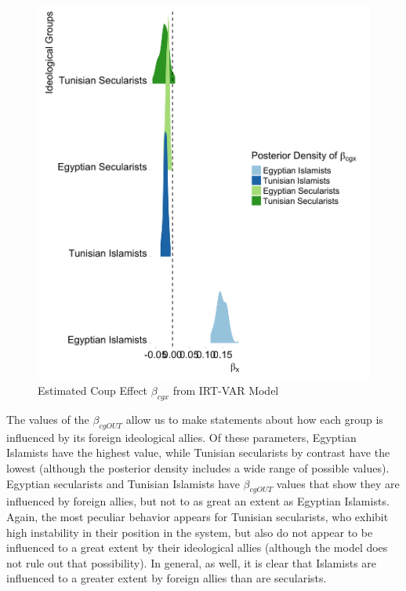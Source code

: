 \documentclass[12pt]{article}
\begin{document}
 \begin{figure}[!h]
	\centering
	\caption{Estimated Coup Effect $\beta_{cgx}$ from IRT-VAR Model}\label{betax}
	\centering
	\includegraphics[width=.9\linewidth]{betax}
\end{figure}

The values of the $\beta_{cgOUT}$ allow us to make statements about how each group is influenced by its foreign ideological allies. Of these parameters, Egyptian Islamists have the highest value, while Tunisian secularists by contrast have the lowest (although the posterior density includes a wide range of possible values). Egyptian secularists and Tunisian Islamists have $\beta_{cgOUT}$ values that show they are influenced by foreign allies, but not to as great an extent as Egyptian Islamists. Again, the most peculiar behavior appears for Tunisian secularists, who exhibit high instability in their position in the system, but also do not appear to be influenced to a great extent by their ideological allies (although the model does not rule out that possibility). In general, as well, it is clear that Islamists are influenced to a greater extent by foreign allies than are secularists.
\end{document}
